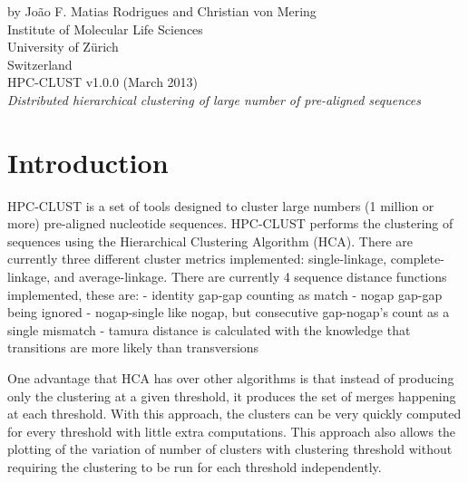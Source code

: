 \documentclass[10pt,a4paper]{article}
\begin{document}
 

\pagestyle{empty} %

{
 \raggedleft %
 \vspace*{\baselineskip} %
 {\Large by Jo\~ao F. Matias Rodrigues and Christian von Mering\\
 Institute of Molecular Life Sciences\\University of Z\"urich\\Switzerland}\\[0.167\textheight] %
 {\Huge HPC-CLUST v1.0.0 (March 2013)}\\[\baselineskip] %
 {\Large \textit{Distributed hierarchical clustering of large number of pre-aligned sequences}}\par %
}
\vfill %
\vspace*{3\baselineskip} %

\newpage

\tableofcontents
\newpage
{}

\section{Introduction}

HPC-CLUST is a set of tools designed to cluster large numbers (1 million or more)
pre-aligned nucleotide sequences. HPC-CLUST performs the clustering of sequences
using the Hierarchical Clustering Algorithm (HCA). There are currently three different
cluster metrics implemented: single-linkage, complete-linkage, and average-linkage.
There are currently 4 sequence distance functions implemented, these are:
- identity
    gap-gap counting as match
- nogap
    gap-gap being ignored
- nogap-single
    like nogap, but consecutive gap-nogap's count as a single mismatch
- tamura
    distance is calculated with the knowledge that transitions are more likely than
   transversions

One advantage that HCA has over other algorithms is that instead of producing only the
clustering at a given threshold, it produces the set of merges happening at each threshold.
With this approach, the clusters can be very quickly computed for every threshold with
little extra computations. This approach also allows the plotting of the variation of
number of clusters with clustering threshold without requiring the clustering to be run
for each threshold independently.
\end{document}
